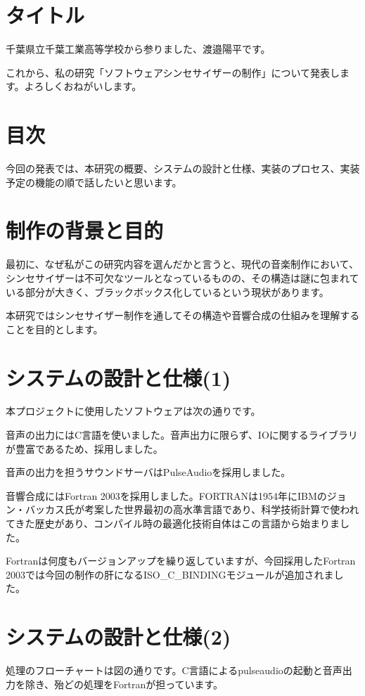 \documentclass[dvipdfmx]{ujarticle}
\begin{document}
\section{タイトル}
千葉県立千葉工業高等学校から参りました、渡邉陽平です。\par
これから、私の研究「ソフトウェアシンセサイザーの制作」について発表します。よろしくおねがいします。\par
\section{目次}
今回の発表では、本研究の概要、システムの設計と仕様、実装のプロセス、実装予定の機能の順で話したいと思います。
\section{制作の背景と目的}
最初に、なぜ私がこの研究内容を選んだかと言うと、現代の音楽制作において、シンセサイザーは不可欠なツールとなっているものの、その構造は謎に包まれている部分が大きく、ブラックボックス化しているという現状があります。\par
本研究ではシンセサイザー制作を通してその構造や音響合成の仕組みを理解することを目的とします。\par
\section{システムの設計と仕様(1)}
本プロジェクトに使用したソフトウェアは次の通りです。\par
音声の出力にはC言語を使いました。音声出力に限らず、IOに関するライブラリが豊富であるため、採用しました。\par
音声の出力を担うサウンドサーバはPulseAudioを採用しました。\par
音響合成にはFortran 2003を採用しました。FORTRANは1954年にIBMのジョン・バッカス氏が考案した世界最初の高水準言語であり、科学技術計算で使われてきた歴史があり、コンパイル時の最適化技術自体はこの言語から始まりました。\par
Fortranは何度もバージョンアップを繰り返していますが、今回採用したFortran 2003では今回の制作の肝になるISO\_C\_BINDINGモジュールが追加されました。\par
\section{システムの設計と仕様(2)}
処理のフローチャートは図の通りです。C言語によるpulseaudioの起動と音声出力を除き、殆どの処理をFortranが担っています。\par
\end{document}
